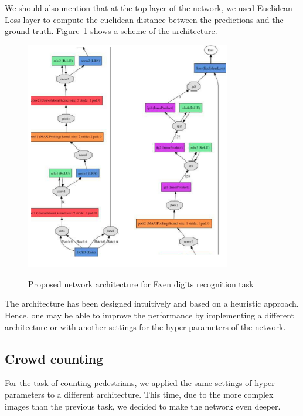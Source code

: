\noindent We should also mention that at the top layer of the network, we used Euclidean Loss layer to compute the euclidean distance between the predictions and the ground truth.  Figure~\ref{fig:l2cNet} shows a scheme of the architecture.
\begin{figure}[H]
  \centering
   {\includegraphics[width=0.8\textwidth]{images/model2}}
	\caption{Proposed network architecture for Even digits recognition task}
	\label{fig:l2cNet}
\end{figure}

The architecture has been designed intuitively and based on a heuristic approach. Hence, one may be able to improve the performance by implementing a different architecture or with another settings for the hyper-parameters of the network. 

\subsection{Crowd counting}
\label{subsec:ucsdarch}

For the task of counting pedestrians, we applied the same settings of hyper-parameters to a different architecture. This time, due to the more complex images than the previous task, we decided to make the network even deeper.

